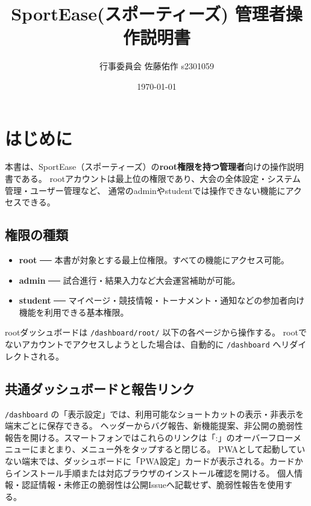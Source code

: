 \documentclass[12pt]{ltjsarticle}
\newcommand{\code}[1]{\colorbox{gray!20}{\texttt{#1}}}
\begin{document}
\title{SportEase(スポーティーズ) 管理者操作説明書}
\author{行事委員会 佐藤佑作 s2301059}
\date{\today}
\maketitle
\tableofcontents

\newpage

\section{はじめに}

本書は、SportEase（スポーティーズ）の\textbf{root権限を持つ管理者}向けの操作説明書である。
rootアカウントは最上位の権限であり、大会の全体設定・システム管理・ユーザー管理など、
通常のadminやstudentでは操作できない機能にアクセスできる。

\subsection*{権限の種類}
\begin{itemize}
  \item \textbf{root} ── 本書が対象とする最上位権限。すべての機能にアクセス可能。
  \item \textbf{admin} ── 試合進行・結果入力など大会運営補助が可能。
  \item \textbf{student} ── マイページ・競技情報・トーナメント・通知などの参加者向け機能を利用できる基本権限。
\end{itemize}

rootダッシュボードは \code{/dashboard/root/} 以下の各ページから操作する。
rootでないアカウントでアクセスしようとした場合は、自動的に \code{/dashboard} へリダイレクトされる。

\subsection*{共通ダッシュボードと報告リンク}

\code{/dashboard} の「表示設定」では、利用可能なショートカットの表示・非表示を端末ごとに保存できる。
ヘッダーからバグ報告、新機能提案、非公開の脆弱性報告を開ける。スマートフォンではこれらのリンクは「:」のオーバーフローメニューにまとまり、メニュー外をタップすると閉じる。
PWAとして起動していない端末では、ダッシュボードに「PWA設定」カードが表示される。カードからインストール手順または対応ブラウザのインストール確認を開ける。
個人情報・認証情報・未修正の脆弱性は公開Issueへ記載せず、脆弱性報告を使用する。
\end{document}
